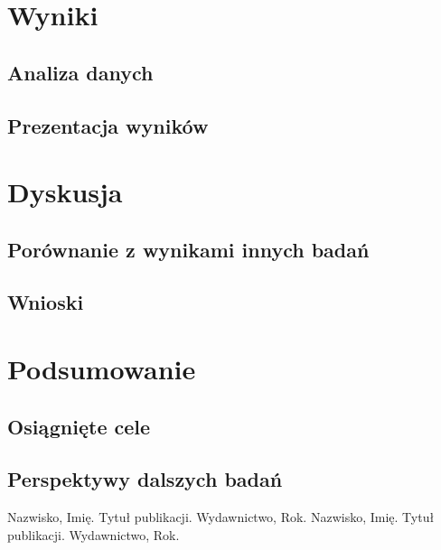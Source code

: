 \documentclass{report}
\begin{document}
	\chapter{Wyniki}
	\section{Analiza danych}
	\section{Prezentacja wyników}
	
	\chapter{Dyskusja}
	\section{Porównanie z wynikami innych badań}
	\section{Wnioski}
	
	\chapter{Podsumowanie}
	\section{Osiągnięte cele}
		\section{Perspektywy dalszych badań}
	
	
	

	
	
	\begin{thebibliography}{99}
		 Nazwisko, Imię. Tytuł publikacji. Wydawnictwo, Rok.
		 Nazwisko, Imię. Tytuł publikacji. Wydawnictwo, Rok.
	\end{thebibliography}
	
\end{document}

